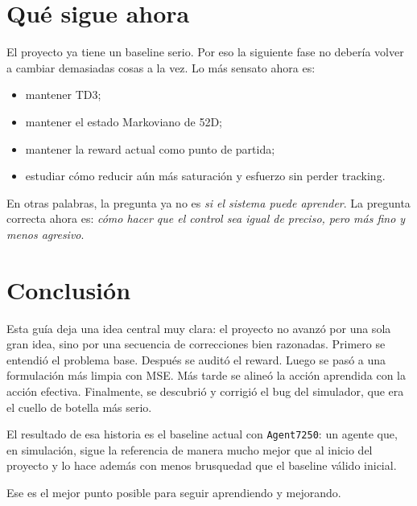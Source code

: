 \documentclass[11pt,a4paper]{article}
\begin{document}
\section{Qu\'e sigue ahora}

El proyecto ya tiene un baseline serio. Por eso la siguiente fase no deber\'ia volver a cambiar demasiadas cosas a la vez. Lo m\'as sensato ahora es:
\begin{itemize}[leftmargin=1.2cm]
    \item mantener TD3;
    \item mantener el estado Markoviano de 52D;
    \item mantener la reward actual como punto de partida;
    \item estudiar c\'omo reducir a\'un m\'as saturaci\'on y esfuerzo sin perder tracking.
\end{itemize}

En otras palabras, la pregunta ya no es \emph{si el sistema puede aprender}.  
La pregunta correcta ahora es: \emph{c\'omo hacer que el control sea igual de preciso, pero m\'as fino y menos agresivo}.

\section{Conclusi\'on}

Esta gu\'ia deja una idea central muy clara: el proyecto no avanz\'o por una sola gran idea, sino por una secuencia de correcciones bien razonadas. Primero se entendi\'o el problema base. Despu\'es se audit\'o el reward. Luego se pas\'o a una formulaci\'on m\'as limpia con MSE. M\'as tarde se aline\'o la acci\'on aprendida con la acci\'on efectiva. Finalmente, se descubri\'o y corrigi\'o el bug del simulador, que era el cuello de botella m\'as serio.

El resultado de esa historia es el baseline actual con \texttt{Agent7250}: un agente que, en simulaci\'on, sigue la referencia de manera mucho mejor que al inicio del proyecto y lo hace adem\'as con menos brusquedad que el baseline v\'alido inicial.

Ese es el mejor punto posible para seguir aprendiendo y mejorando.



\end{document}

